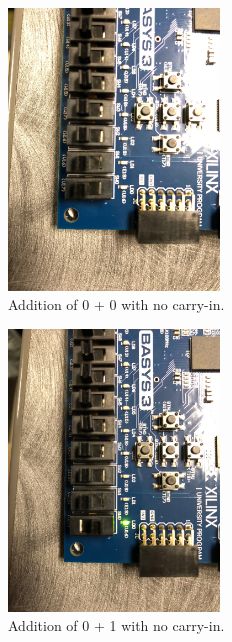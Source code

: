 \documentclass[11pt]{article}
\begin{document}
\begin{figure}[H]
\begin{center}
\includegraphics[width=0.5\textwidth]{report-images/Part3/IMG_0449.jpg}
\caption{Addition of 0 + 0 with no carry-in.}
\label{fig:fullAdderImgOne}
\end{center}
\end{figure}

\begin{figure}[H]
\begin{center}
\includegraphics[width=0.5\textwidth]{report-images/Part3/IMG_0450.jpg}
\caption{Addition of 0 + 1 with no carry-in.}
\label{fig:fullAdderImgTwo}
\end{center}
\end{figure}
\end{document}
